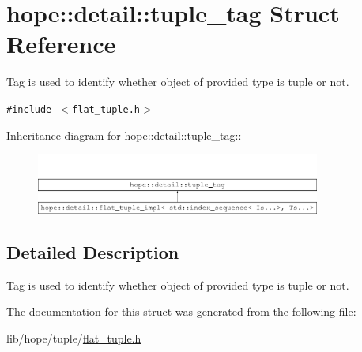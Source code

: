 \hypertarget{structhope_1_1detail_1_1tuple__tag}{
\section{hope::detail::tuple\_\-tag Struct Reference}
\label{structhope_1_1detail_1_1tuple__tag}
}
Tag is used to identify whether object of provided type is tuple or not.  


{\tt \#include $<$flat\_\-tuple.h$>$}

Inheritance diagram for hope::detail::tuple\_\-tag::\begin{figure}[H]
\begin{center}
\leavevmode
\includegraphics[height=2cm]{structhope_1_1detail_1_1tuple__tag}
\end{center}
\end{figure}


\subsection{Detailed Description}
Tag is used to identify whether object of provided type is tuple or not. 

The documentation for this struct was generated from the following file:\begin{CompactItemize}
\item 
lib/hope/tuple/\hyperlink{flat__tuple_8h}{flat\_\-tuple.h}\end{CompactItemize}
